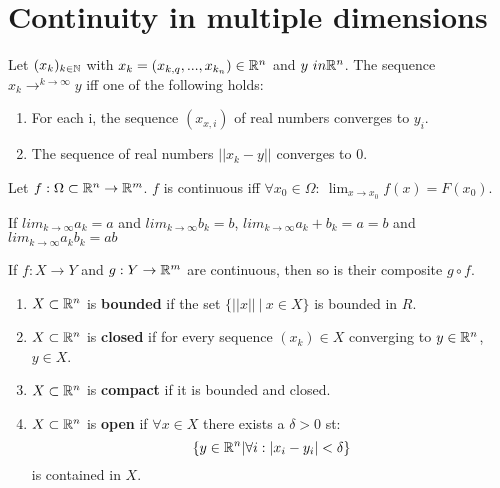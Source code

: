 \chapter{Continuity in multiple dimensions}

\begin{definition}[Convergence in $R^n$]
	Let $(x_k)_{k \in \mathbb{N}}$ with $x_k = (x_{k,q},...,x_{k_n}) \in \mathbb{R}^n$ and $y \ in \mathbb{R}^n$. 
	The sequence $x_k \to^{k\to\infty} y$ iff one of the following holds:
	\begin{enumerate}
		\item For each i, the sequence $(x_{x,i})$ of real numbers converges to $y_i$.
		\item The sequence of real numbers $||x_k - y||$ converges to 0.
	\end{enumerate}
\end{definition}

\begin{definition}[Continuity]
	Let $f: \Omega \subset \mathbb{R}^n \to \mathbb{R}^m$.
	$f$ is continuous iff $\forall x_0 \in \Omega: \ \lim_{x \to x_0} f(x) = F(x_0)$.
\end{definition}

\begin{theorem}
	If $lim_{k \to \infty}a_k = a$ and  $lim_{k \to \infty} b_k = b$, $lim_{k \to \infty}a_k+b_k = a=b$ and  $lim_{k \to \infty}a_kb_k = ab$ 
\end{theorem}

\begin{proposition}
	If $f: X \to Y$ and $g: Y \to \mathbb{R}^m$ are continuous, then so is their composite $g \circ f$.
\end{proposition}

\begin{definition}
	\begin{enumerate}
		\item $X \subset \mathbb{R}^n$ is \textbf{bounded} if the set $\{||x|| \ | \ x \in X\}$ is bounded in $R$.
		\item $X \subset \mathbb{R}^n$ is \textbf{closed} if for every sequence $(x_k) \in X$ converging to $y \in \mathbb{R}^n$, $y \in X$.
		\item $X \subset \mathbb{R}^n$ is \textbf{compact} if it is bounded and closed.
		\item $X \subset \mathbb{R}^n$ is \textbf{open} if $\forall x \in X$ there exists a $\delta > 0$ st:
			$$\{y \in \mathbb{R}^n | \forall i: |x_i -y_i| < \delta\}$$
			is contained in $X$.
	\end{enumerate}
\end{definition}

